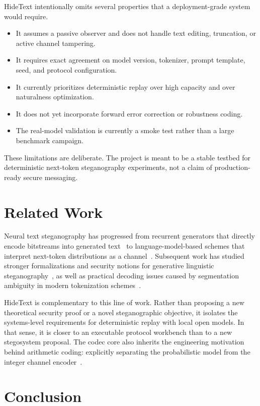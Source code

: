 \documentclass[sigconf,review,anonymous]{acmart}
\begin{document}
HideText intentionally omits several properties that a deployment-grade system would require.

\begin{itemize}
    \item It assumes a passive observer and does not handle text editing, truncation, or active channel tampering.
    \item It requires exact agreement on model version, tokenizer, prompt template, seed, and protocol configuration.
    \item It currently prioritizes deterministic replay over high capacity and over naturalness optimization.
    \item It does not yet incorporate forward error correction or robustness coding.
    \item The real-model validation is currently a smoke test rather than a large benchmark campaign.
\end{itemize}

These limitations are deliberate. The project is meant to be a stable testbed for deterministic next-token steganography experiments, not a claim of production-ready secure messaging.

\section{Related Work}

Neural text steganography has progressed from recurrent generators that directly encode bitstreams into generated text~\cite{yang2018rnnstega} to language-model-based schemes that interpret next-token distributions as a channel~\cite{ziegler2019neural}. Subsequent work has studied stronger formalizations and security notions for generative linguistic steganography~\cite{zhang2021provably}, as well as practical decoding issues caused by segmentation ambiguity in modern tokenization schemes~\cite{nozaki2022addressing}.

HideText is complementary to this line of work. Rather than proposing a new theoretical security proof or a novel steganographic objective, it isolates the systems-level requirements for deterministic replay with local open models. In that sense, it is closer to an executable protocol workbench than to a new stegosystem proposal. The codec core also inherits the engineering motivation behind arithmetic coding: explicitly separating the probabilistic model from the integer channel encoder~\cite{witten1987arithmetic}.

\section{Conclusion}
\end{document}

